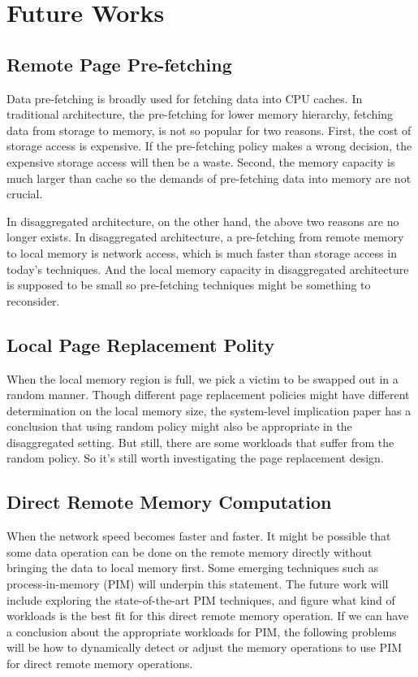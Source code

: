 \documentclass[twocolumn]{article}
\begin{document}
\section{Future Works}                              
                                         
\subsection{Remote Page Pre-fetching}                       
Data pre-fetching is broadly used for fetching data into CPU caches. In traditional architecture, the pre-fetching for lower memory hierarchy, fetching data from storage to memory, is not so popular for two reasons. First, the cost of storage access is expensive. If the pre-fetching policy makes a wrong decision, the expensive storage access will then be a waste. Second, the memory capacity is much larger than cache so the demands of pre-fetching data into memory are not crucial.
                                         
In disaggregated architecture, on the other hand, the above two reasons are no longer exists. In disaggregated architecture, a pre-fetching from remote memory to local memory is network access, which is much faster than storage access in today's techniques. And the local memory capacity in disaggregated architecture is supposed to be small so pre-fetching techniques might be something to reconsider.
                                         
\subsection{Local Page Replacement Polity}                    
When the local memory region is full, we pick a victim to be swapped out in a random manner. Though different page replacement policies might have different determination on the local memory size, the system-level implication paper \cite{Disaggregated_memory2} has a conclusion that using random policy might also be appropriate in the disaggregated setting. But still, there are some workloads that suffer from the random policy. So it's still worth investigating the page replacement design.

\subsection{Direct Remote Memory Computation}                   
When the network speed becomes faster and faster. It might be possible that some data operation can be done on the remote memory directly without bringing the data to local memory first. Some emerging techniques such as process-in-memory (PIM) will underpin this statement. The future work will include exploring the state-of-the-art PIM techniques, and figure what kind of workloads is the best fit for this direct remote memory operation. If we can have a conclusion about the appropriate workloads for PIM, the following problems will be how to dynamically detect or adjust the memory operations to use PIM for direct remote memory operations.
                                         
\end{document}
